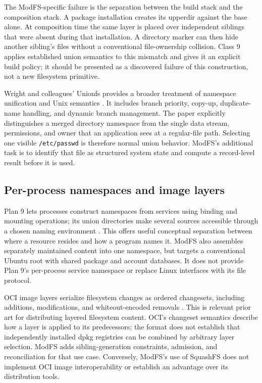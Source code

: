 The ModFS-specific failure is the separation between the build stack and the composition stack. A package installation creates its upperdir against the base alone. At composition time the same layer is placed over independent siblings that were absent during that installation. A directory marker can then hide another sibling's files without a conventional file-ownership collision. Class \num{9} applies established union semantics to this mismatch and gives it an explicit build policy; it should be presented as a discovered failure of this construction, not a new filesystem primitive.

Wright and colleagues' Unionfs provides a broader treatment of namespace unification and Unix semantics \autocite{wright2006namespace}. It includes branch priority, copy-up, duplicate-name handling, and dynamic branch management. The paper explicitly distinguishes a merged directory namespace from the single data stream, permissions, and owner that an application sees at a regular-file path. Selecting one visible \texttt{/etc/passwd} is therefore normal union behavior. ModFS's additional task is to identify that file as structured system state and compute a record-level result before it is used.

\subsection{Per-process namespaces and image layers}

Plan \num{9} lets processes construct namespaces from services using binding and mounting operations; its union directories make several sources accessible through a chosen naming environment \autocite{pike1993namespaces,pike1995plan9}. This offers useful conceptual separation between where a resource resides and how a program names it. ModFS also assembles separately maintained content into one namespace, but targets a conventional Ubuntu root with shared package and account databases. It does not provide Plan \num{9}'s per-process service namespace or replace Linux interfaces with its file protocol.

\ac{OCI} image layers serialize filesystem changes as ordered changesets, including additions, modifications, and whiteout-encoded removals \autocite{oci-image-spec}. This is relevant prior art for distributing layered filesystem content. \ac{OCI}'s changeset semantics describe how a layer is applied to its predecessors; the format does not establish that independently installed dpkg registries can be combined by arbitrary layer selection. ModFS adds sibling-generation constraints, admission, and reconciliation for that use case. Conversely, ModFS's use of SquashFS does not implement \ac{OCI} image interoperability or establish an advantage over its distribution tools.


